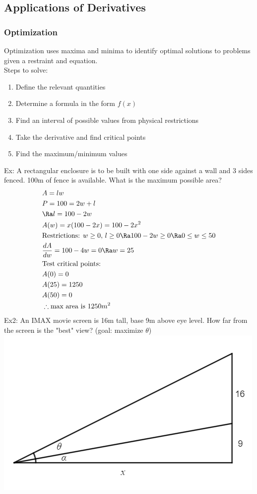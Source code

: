 \subsection{Applications of Derivatives}

\subsubsection{Optimization}
Optimization uses maxima and minima to identify optimal solutions to problems given a restraint and equation.\\
Steps to solve:
\begin{enumerate}
    \item Define the relevant quantities
    \item Determine a formula in the form $f(x)$
    \item Find an interval of possible values from physical restrictions
    \item Take the derivative and find critical points
    \item Find the maximum/minimum values
\end{enumerate}
Ex: A rectangular enclosure is to be built with one side against a wall and 3 sides fenced. 100m of fence is available. What is the maximum possible area?
\begin{align*}
    &A=lw\\
    &P=100=2w+l\\
    &\Ra l=100-2w\\
    &A(w)=x(100-2x)=100-2x^2\\
    &\text{Restrictions: }w\geq 0,\, l\geq 0\Ra 100-2w\geq 0\Ra 0\leq w\leq 50\\
    &\frac{dA}{dw}=100-4w=0\Ra w=25\\
    &\text{Test critical points: }\\
    &A(0)=0\\
    &A(25)=1250\\
    &A(50)=0\\
    &\therefore \text{max area is }1250m^2
\end{align*}
Ex2: An IMAX movie screen is 16m tall, base 9m above eye level. How far from the screen is the "best" view? (goal: maximize $\theta$)\\
\includegraphics[scale=0.8]{DifferentialCalculusPictures/OptimizationEx.png}

